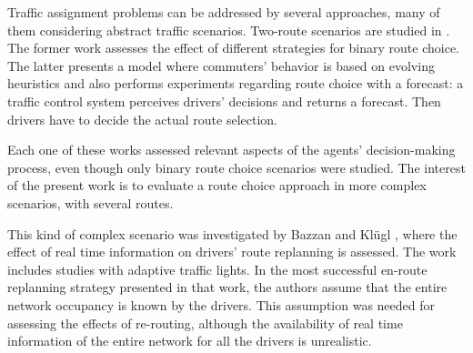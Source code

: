 \documentclass{RITA}
\begin{document}



Traffic assignment problems can be addressed by several approaches, many of them considering abstract traffic scenarios. Two-route scenarios are studied in \cite{Bazzan+2000icmas,Kluegl&Bazzan2004jasss}. The former work assesses the effect of different strategies for binary route choice. The latter presents a model where commuters' behavior is based on evolving heuristics and also performs experiments regarding route choice with a forecast: a traffic control system perceives drivers' decisions and returns a forecast. Then drivers have to decide the actual route selection. %

Each one of these works assessed relevant aspects of the agents' decision-making process, even though only binary route choice scenarios were studied. The interest of the present work is to evaluate a route choice approach in more complex scenarios, with several routes.

This kind of complex scenario was investigated by Bazzan and Kl\"ugl \cite{Bazzan&Kluegl2008}, where the effect of real time information on drivers' route replanning is assessed. The work includes studies with adaptive traffic lights. In the most successful en-route replanning strategy presented in that work, the authors assume that the entire network occupancy is known by the drivers. This assumption was needed for assessing the effects of re-routing, although the availability of real time information of the entire network for all the drivers is  unrealistic.
\end{document}
